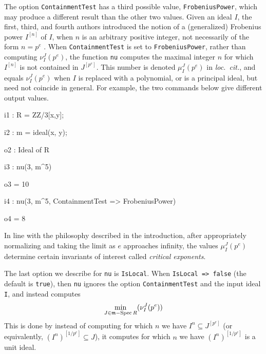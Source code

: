 \documentclass{amsart}
\begin{document}

The option {\tt ContainmentTest} has a third possible value, {\tt FrobeniusPower}, which may produce a different result than the other two values.
Given an ideal $I$, the first, third, and fourth authors introduced the notion of a (generalized) Frobenius power $I^{[n]}$ of $I$, when $n$ is an arbitrary positive integer, not necessarily of the form $n = p^e$ \cite{hernandez+etal.frobenius_powers}.
When {\tt ContainmentTest} is set to {\tt FrobeniusPower}, rather than  computing $\nu_I^J(p^e)$, the function {\tt nu} computes the
maximal integer $n$ for which $I^{[n]}$ is not contained in $J^{[p^e]}$.  This number is denoted $\mu_I^J(p^e)$ in \emph{loc.\ cit.}, and equals $\nu_I^J(p^e)$ when $I$ is replaced with a polynomial, or is a principal ideal, but need not coincide in general.
For example, the two commands below give different output values.

{\small
{}
\begin{MyVerbatim}

i1 : R = ZZ/3[x,y];

i2 : m = ideal(x, y);

o2 : Ideal of R

i3 : nu(3, m^5)

o3 = 10

i4 : nu(3, m^5, ContainmentTest => FrobeniusPower)

o4 = 8
\end{MyVerbatim}
}

\medspace
\noindent In line with the philosophy described in the introduction, after appropriately normalizing and taking the limit as $e$ approaches infinity, the values $\mu_I^J(p^e)$ determine certain invariants of interest called \emph{critical exponents}.

The last option we describe for {\tt nu} is {\tt IsLocal}.  When {\tt IsLocal => false} (the default is {\tt true}), then {\tt nu} ignores the option {\tt ContainmentTest} and the input ideal {\tt I}, and instead computes
\[
\min_{J \in \mathfrak{m}-\operatorname{{Spec}} R} (\nu_I^J(p^e))
\]
This is done by instead of computing for which $n$ we have $I^{n} \subseteq J^{[p^e]}$ (or equivalently, $(I^n)^{[1/p^e]} \subseteq J$), it computes for which $n$ we have $(I^n)^{[1/p^e]}$ is a unit ideal.




\end{document}
